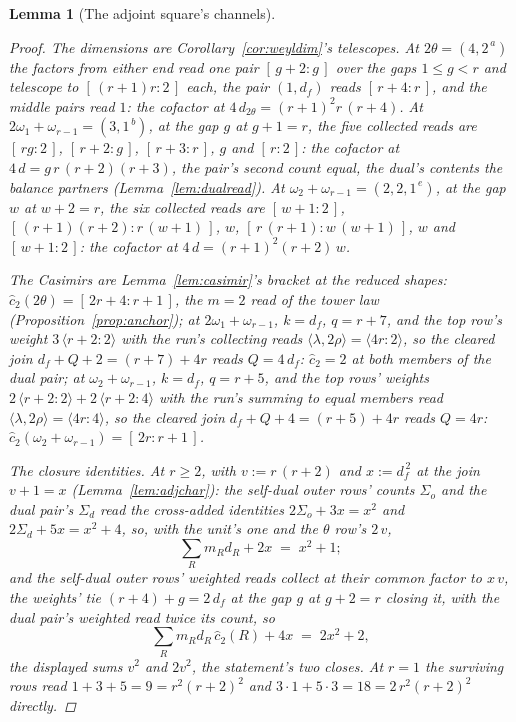 \documentclass[11pt]{article}
\newtheorem{lemma}{Lemma}
\theoremstyle{definition}
\begin{document}
\begin{lemma}[The adjoint square's channels]
\begin{proof}
\emph{The dimensions} are Corollary~\ref{cor:weyldim}'s telescopes. At
$2\theta=(4,2^{\,a})$ the factors from either end read one pair
$[\,g+2:g\,]$ over the gaps $1\le g<r$ and telescope to
$[\,(r+1)r:2\,]$ each, the
pair $(1,d_f)$ reads $[\,r+4:r\,]$, and the middle pairs read $1$:
the cofactor at $4\,d_{2\theta}=(r+1)^2r\,(r+4)$. At
$2\omega_1{+}\omega_{r-1}
=(3,1^{\,b})$, at the gap $g$ at $g+1=r$, the five
collected reads are $[\,rg:2\,]$, $[\,r+2:g\,]$, $[\,r+3:r\,]$,
$g$ and $[\,r:2\,]$:
the cofactor at $4\,d=g\,r\,(r+2)(r+3)$, the pair's second count
equal, the dual's
contents the balance partners
(Lemma~\ref{lem:dualread}). At $\omega_2{+}\omega_{r-1}
=(2,2,1^{\,e})$, at the gap $w$ at $w+2=r$, the six collected
reads are $[\,w+1:2\,]$, $[\,(r+1)(r+2):r\,(w+1)\,]$, $w$,
$[\,r\,(r+1):w\,(w+1)\,]$, $w$ and $[\,w+1:2\,]$: the
cofactor at $4\,d=(r+1)^2(r+2)\,w$.

\emph{The Casimirs} are Lemma~\ref{lem:casimir}'s bracket at the
reduced shapes: $\hat c_2(2\theta)=[\,2r+4:r+1\,]$, the $m=2$ read of the
tower law (Proposition~\ref{prop:anchor}); at $2\omega_1{+}\omega_{r-1}$,
$k=d_f$, $q=r+7$, and the top row's weight $3\,\langle r+2\!:\!2\rangle$
with the run's collecting reads
$\langle\lambda,2\rho\rangle=\langle 4r\!:\!2\rangle$, so the cleared
join $d_f+Q+2=(r+7)+4r$ reads
$Q=4\,d_f$: $\hat c_2=2$ at both members of the dual
pair; at $\omega_2{+}\omega_{r-1}$,
$k=d_f$, $q=r+5$, and the top rows' weights
$2\,\langle r+2\!:\!2\rangle+2\,\langle r+2\!:\!4\rangle$ with the
run's summing to equal members read
$\langle\lambda,2\rho\rangle=\langle 4r\!:\!4\rangle$, so the cleared
join $d_f+Q+4=(r+5)+4r$ reads $Q=4r$:
$\hat c_2(\omega_2{+}\omega_{r-1})=[\,2r:r+1\,]$.

\emph{The closure identities.} At $r\ge2$, with $v:=r\,(r+2)$ and
$x:=d_f^{\,2}$ at the join $v+1=x$ (Lemma~\ref{lem:adjchar}): the
self-dual outer rows' counts $\Sigma_o$ and the dual pair's
$\Sigma_d$ read the cross-added identities $2\Sigma_o+3x=x^2$ and
$2\Sigma_d+5x=x^2+4$, so, with the unit's one and the $\theta$ row's
$2\,v$,
\[
\sum_Rm_Rd_R+2x\;=\;x^2+1 ;
\]
and the self-dual outer rows' weighted reads collect at their common
factor to $x\,v$, the weights' tie $(r+4)+g=2\,d_f$ at the gap $g$ at
$g+2=r$ closing
it, with
the dual pair's weighted read twice its count, so
\[
\sum_Rm_Rd_R\,\hat c_2(R)+4x\;=\;2x^2+2 ,
\]
the displayed sums $v^2$ and $2v^2$, the statement's two
closes.
At $r=1$ the surviving rows read $1+3+5=9=r^2(r+2)^2$ and
$3\cdot1+5\cdot3=18=2\,r^2(r+2)^2$ directly.
\end{proof}
\end{lemma}
\end{document}
